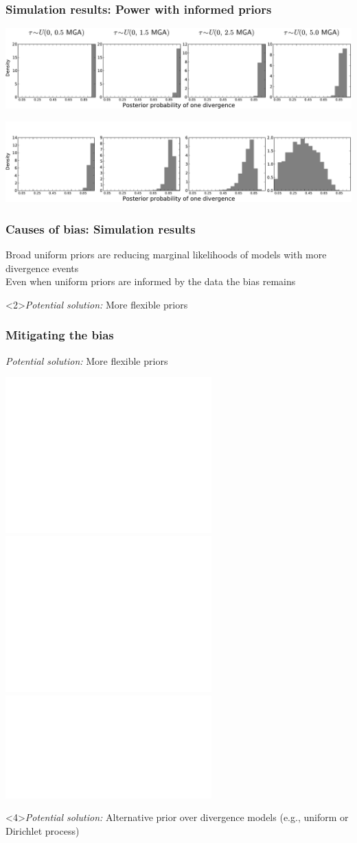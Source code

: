 \begin{frame}[t]
    \frametitle{Simulation results: Power with informed priors}
    \vspace{1cm}
        \centerline{
        \includegraphics[width=\textwidth]{../images/old-sims_power_psi_prob.pdf}}
        \vspace{0mm}
        \centerline{
        \includegraphics[width=\textwidth]{../images/old-sims-inform10_power_psi_prob_headless.pdf}}
\end{frame}

\begin{frame}
    \frametitle{Causes of bias: Simulation results}
    Broad uniform priors are reducing marginal likelihoods of models with more
    divergence events\\
    \bigskip
    Even when uniform priors are informed by the data the bias remains\\
    \bigskip
    \begin{block}<2>{\it Potential solution:}
        More flexible priors
    \end{block}
\end{frame}

\begin{frame}[t]
    \frametitle{Mitigating the bias}
    \begin{block}{\it Potential solution:}
        More flexible priors
    \end{block}
    \smallskip
    \centerline{
        \includegraphics<1>[height=6.0cm]{../images/marginal-plot-2d-uniform-prior.pdf}
        \includegraphics<2>[height=6.0cm]{../images/marginal-plot-2d.pdf}
        \includegraphics<3>[width=\textwidth]{../images/partition_numbers.pdf}}
    \begin{block}<4>{\it Potential solution:}
        Alternative prior over divergence models
        (e.g., uniform or Dirichlet process)
    \end{block}
\end{frame}

